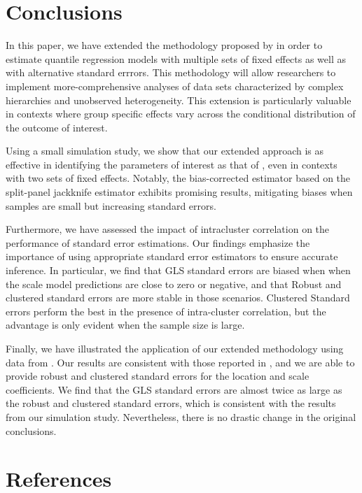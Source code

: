 \documentclass[
  authoryear,
  review,
  1p]{elsarticle}
\begin{document}
\section{Conclusions}\label{conclusions}

In this paper, we have extended the methodology proposed by
\citet{mss2019} in order to estimate quantile regression models with
multiple sets of fixed effects as well as with alternative standard
errrors. This methodology will allow researchers to implement
more-comprehensive analyses of data sets characterized by complex
hierarchies and unobserved heterogeneity. This extension is particularly
valuable in contexts where group specific effects vary across the
conditional distribution of the outcome of interest.

Using a small simulation study, we show that our extended approach is as
effective in identifying the parameters of interest as that of
\citet{mss2019}, even in contexts with two sets of fixed effects.
Notably, the bias-corrected estimator based on the split-panel jackknife
estimator exhibits promising results, mitigating biases when samples are
small but increasing standard errors.

Furthermore, we have assessed the impact of intracluster correlation on
the performance of standard error estimations. Our findings emphasize
the importance of using appropriate standard error estimators to ensure
accurate inference. In particular, we find that GLS standard errors are
biased when when the scale model predictions are close to zero or
negative, and that Robust and clustered standard errors are more stable
in those scenarios. Clustered Standard errors perform the best in the
presence of intra-cluster correlation, but the advantage is only evident
when the sample size is large.

Finally, we have illustrated the application of our extended methodology
using data from \citet{persson_economic_2005}. Our results are
consistent with those reported in \citet{mss2019}, and we are able to
provide robust and clustered standard errors for the location and scale
coefficients. We find that the GLS standard errors are almost twice as
large as the robust and clustered standard errors, which is consistent
with the results from our simulation study. Nevertheless, there is no
drastic change in the original conclusions.

\section*{References}\label{references}
\end{document}
